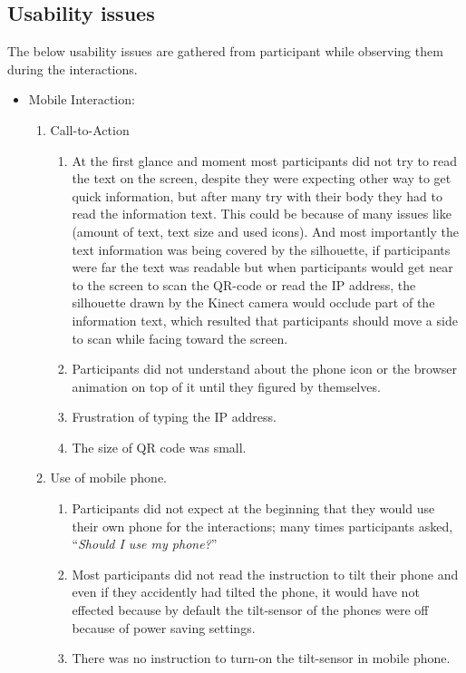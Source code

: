 \subsection{Usability issues}
The below usability issues are gathered from participant while observing them during the interactions.


\begin{itemize}

\item Mobile Interaction: \\


\begin{enumerate}
\item	Call-to-Action
\begin{enumerate}
\item	At the first glance and moment most participants did not try to read the text on the screen, despite they were expecting other way to get quick information, but after many try with their body they had to read the information text. This could be because of many issues like (amount of text, text size and used icons). And most importantly the text information was being covered by the silhouette, if participants were far the text was readable but when participants would get near to the screen to scan the QR-code or read the IP address, the silhouette drawn by the Kinect camera would occlude part of the information text, which resulted that participants should move a side to scan while facing toward the screen.
\item	Participants did not understand about the phone icon or the browser animation on top of it until they figured by themselves.
\item	Frustration of typing the IP address.
\item	The size of QR code was small.
\end{enumerate}

\item	Use of mobile phone.
\begin{enumerate}
\item	Participants did not expect at the beginning that they would use their own phone for the interactions; many times participants asked, ``\emph{Should I use my phone?}'' 
\item	Most participants did not read the instruction to tilt their phone and even if they accidently had tilted the phone, it would have not effected because by default the tilt-sensor of the phones were off because of power saving settings. 
\item	There was no instruction to turn-on the tilt-sensor in mobile phone.
\end{enumerate}


\end{enumerate}
\end{itemize}
